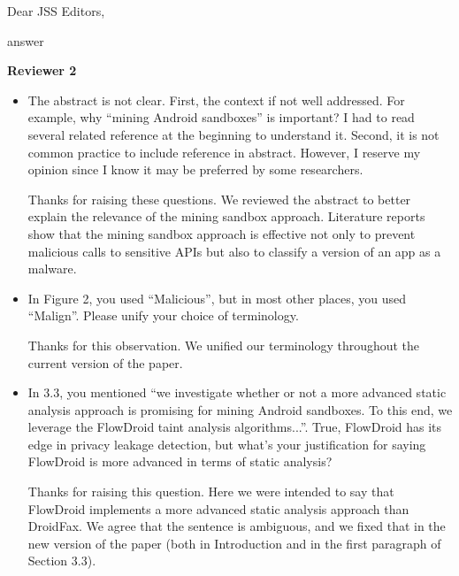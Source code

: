 \documentclass[12pt,english]{scrartcl}
\begin{document}
\begin{letter}{Dear JSS Editors,}
\begin{itemize}
\vspace{0.2cm}

{\color{blue}{\bf Answer.} answer}


\end{itemize}

{\bf Reviewer 2}

\begin{itemize}

\item The abstract is not clear. First, the context if not well addressed.
  For example, why ``mining Android sandboxes'' is important? I had to read
  several related reference at the beginning to understand it. Second, it is not common practice to 
include reference in abstract. However, I reserve my opinion since I know it may be preferred by some researchers.


\vspace{0.2cm}

{\color{blue}{\bf Answer.} Thanks for raising these questions. We reviewed the abstract
  to better explain the relevance of the mining sandbox approach. Literature reports
  show that the mining sandbox approach is effective  not only to prevent malicious
  calls to sensitive APIs but also to classify a version of an app as a malware.}

\vspace{0.2cm}

\item In Figure 2, you used ``Malicious'', but in most other places, you used ``Malign''.
  Please unify your choice of terminology.


\vspace{0.2cm}

{\color{blue}{\bf Answer.} Thanks for this observation. We unified our terminology throughout the current
  version of the paper.}

\vspace{0.2cm}

\item In 3.3, you mentioned ``we investigate whether or not a more advanced static analysis approach is promising for mining 
Android sandboxes. To this end, we leverage the FlowDroid taint analysis algorithms...''. True, FlowDroid has its edge 
in privacy leakage detection, but what's your justification for saying FlowDroid is more advanced in terms of static analysis?


\vspace{0.2cm}

{\color{blue}{\bf Answer.} Thanks for raising this question. Here we were intended to say that FlowDroid implements a more advanced static analysis approach than DroidFax. We agree that the sentence is ambiguous, and we fixed that in the new version of the paper (both in Introduction and in the first paragraph
  of Section 3.3).}


\end{itemize}
\end{letter}
\end{document}
